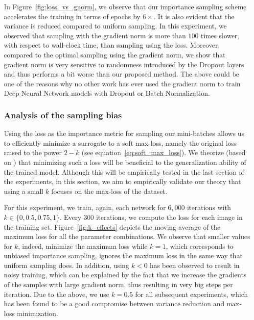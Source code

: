 \documentclass{article}
\begin{document}
In Figure~\ref{fig:loss_vs_gnorm}, we observe that our importance sampling
scheme accelerates the training in terms of epochs by $6\times$. It is also
evident that the variance is reduced compared to uniform sampling. In this
experiment, we observed that sampling with the gradient norm is more than $100$
times slower, with respect to wall-clock time, than sampling using the loss.
Moreover, compared to the optimal sampling using the gradient norm, we show
that gradient norm is very sensitive to randomness introduced by the Dropout
layers and thus performs a bit worse than our proposed method. The above could
be one of the reasons why no other work has ever used the gradient norm to
train Deep Neural Network models with Dropout or Batch Normalization.

\subsubsection{Analysis of the sampling bias} 

Using the loss as the importance metric for sampling our mini-batches allows us
to efficiently minimize a surrogate to a soft max-loss, namely the original
loss raised to the power $2-k$ (see equation~\ref{eq:soft_max_loss}). We
theorize (based on \cite{shalev2016minimizing})  that minimizing such a loss
will be beneficial to the generalization ability of the trained model. Although
this will be empirically tested in the last section of the experiments, in this
section, we aim to  empirically validate our theory that using a small $k$
focuses on the max-loss of the dataset.

For this experiment, we train, again, each network for $6,000$ iterations with
$k \in \{0, 0.5, 0.75, 1\}$. Every $300$ iterations, we compute the loss for
each image in the training set. Figure~\ref{fig:k_effects} depicts the moving
average of the maximum loss for all the parameter combinations. We observe that
smaller values for $k$, indeed, minimize the maximum loss while $k=1$, which
corresponds to unbiased importance sampling, ignores the maximum loss in the
same way that uniform sampling does. In addition, using $k < 0$ has been
observed to result in noisy training, which can be explained by the fact that
we increase the gradients of the samples with large gradient norm, thus
resulting in very big steps per iteration. Due to the above, we use $k=0.5$ for
all subsequent experiments, which has been found to be a good compromise
between variance reduction and max-loss minimization.
\end{document}
